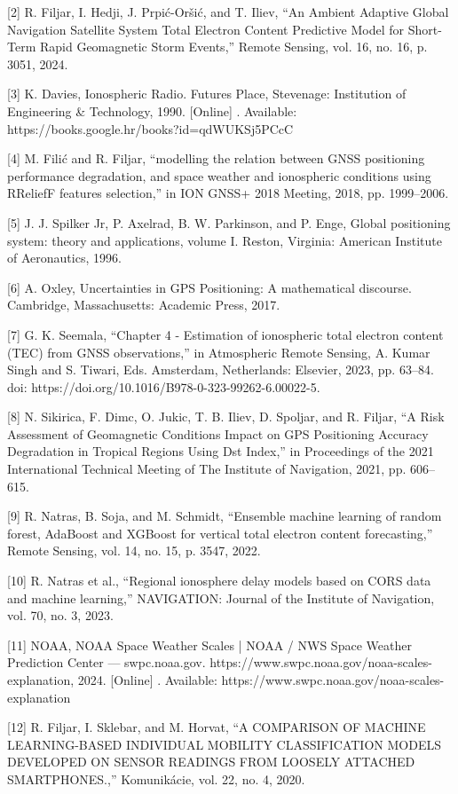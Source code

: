 \documentclass[sn-mathphys-num]{sn-jnl}%
\begin{document}
[2] R. Filjar, I. Hedji, J. Prpić-Oršić, and T. Iliev, “An Ambient Adaptive Global Navigation Satellite System Total Electron Content Predictive Model for Short-Term Rapid Geomagnetic Storm Events,” Remote Sensing, vol. 16, no. 16, p. 3051, 2024.

[3] K. Davies, Ionospheric Radio. Futures Place, Stevenage: Institution of Engineering & Technology, 1990. [Online] . Available: https://books.google.hr/books?id=qdWUKSj5PCcC

[4] M. Filić and R. Filjar, “modelling the relation between GNSS positioning performance degradation, and space weather and ionospheric conditions using RReliefF features selection,” in ION GNSS+ 2018 Meeting, 2018, pp. 1999–2006.

[5] J. J. Spilker Jr, P. Axelrad, B. W. Parkinson, and P. Enge, Global positioning system: theory and applications, volume I. Reston, Virginia: American Institute of Aeronautics, 1996.

[6] A. Oxley, Uncertainties in GPS Positioning: A mathematical discourse. Cambridge, Massachusetts: Academic Press, 2017.

[7] G. K. Seemala, “Chapter 4 - Estimation of ionospheric total electron content (TEC) from GNSS observations,” in Atmospheric Remote Sensing, A. Kumar Singh and S. Tiwari, Eds. Amsterdam, Netherlands: Elsevier, 2023, pp. 63–84. doi: https://doi.org/10.1016/B978-0-323-99262-6.00022-5.

[8] N. Sikirica, F. Dimc, O. Jukic, T. B. Iliev, D. Spoljar, and R. Filjar, “A Risk Assessment of Geomagnetic Conditions Impact on GPS Positioning Accuracy Degradation in Tropical Regions Using Dst Index,” in Proceedings of the 2021 International Technical Meeting of The Institute of Navigation, 2021, pp. 606–615.

[9] R. Natras, B. Soja, and M. Schmidt, “Ensemble machine learning of random forest, AdaBoost and XGBoost for vertical total electron content forecasting,” Remote Sensing, vol. 14, no. 15, p. 3547, 2022.

[10] R. Natras et al., “Regional ionosphere delay models based on CORS data and machine learning,” NAVIGATION: Journal of the Institute of Navigation, vol. 70, no. 3, 2023.

[11] NOAA, NOAA Space Weather Scales | NOAA / NWS Space Weather Prediction Center — swpc.noaa.gov. https://www.swpc.noaa.gov/noaa-scales-explanation, 2024. [Online] . Available: https://www.swpc.noaa.gov/noaa-scales-explanation

[12] R. Filjar, I. Sklebar, and M. Horvat, “A COMPARISON OF MACHINE LEARNING-BASED INDIVIDUAL MOBILITY CLASSIFICATION MODELS DEVELOPED ON SENSOR READINGS FROM LOOSELY ATTACHED SMARTPHONES.,” Komunikácie, vol. 22, no. 4, 2020.
\end{document}
